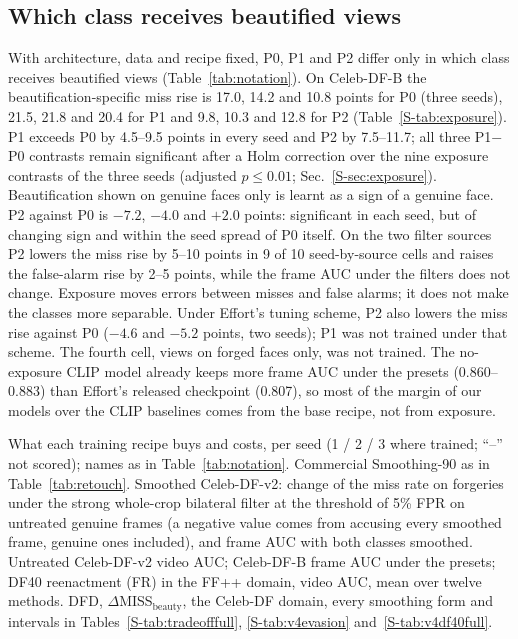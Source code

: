 \documentclass[conference]{IEEEtran}
\begin{document}
\subsection{Which class receives beautified views}
\label{sec:exposure}
With architecture, data and recipe fixed, P0, P1 and P2 differ only in which class receives beautified views
(Table~\ref{tab:notation}). On Celeb-DF-B the beautification-specific miss rise is 17.0, 14.2 and 10.8 points for P0 (three
seeds), 21.5, 21.8 and 20.4 for P1 and 9.8, 10.3 and 12.8 for P2 (Table~\ref{S-tab:exposure}). P1 exceeds P0 by 4.5--9.5 points
in every seed and P2 by 7.5--11.7; all three P1$-$P0 contrasts remain significant after a Holm correction over the nine exposure contrasts of the three seeds (adjusted $p\le0.01$; Sec.~\ref{S-sec:exposure}). Beautification shown on genuine faces only is learnt as a sign of a genuine face. P2
against P0 is $-7.2$, $-4.0$ and $+2.0$ points: significant in each seed, but of changing sign and within the seed spread of P0
itself. On the two filter sources P2 lowers the miss
rise by 5--10 points in 9 of 10 seed-by-source cells and raises the false-alarm rise by 2--5 points, while the frame AUC under
the filters does not change. Exposure moves errors between misses and false alarms; it does not make the classes more
separable. Under Effort's tuning scheme, P2 also lowers the miss rise against P0 ($-4.6$ and $-5.2$ points, two seeds); P1 was
not trained under that scheme. The fourth cell, views on forged faces only, was not trained. The no-exposure CLIP model already
keeps more frame AUC under the presets (0.860--0.883) than Effort's released checkpoint (0.807), so most of the margin of our
models over the CLIP baselines comes from the base recipe, not from exposure.

\begin{table}[t]
\centering
\caption{What each training recipe buys and costs, per seed (1 / 2 / 3 where trained; ``--'' not scored); names as in
Table~\ref{tab:notation}. Commercial Smoothing-90 as in Table~\ref{tab:retouch}. Smoothed Celeb-DF-v2: change of the miss rate on
forgeries under the strong whole-crop bilateral filter at the threshold of 5\% FPR on untreated genuine frames (a negative value
comes from accusing every smoothed frame, genuine ones included), and frame AUC with both classes smoothed. Untreated Celeb-DF-v2
video AUC; Celeb-DF-B frame AUC under the presets; DF40 reenactment (FR) in the FF++ domain, video AUC, mean over twelve methods.
DFD, $\Delta$MISS$_\text{beauty}$, the Celeb-DF domain, every smoothing form and intervals in
Tables~\ref{S-tab:tradeofffull}, \ref{S-tab:v4evasion} and~\ref{S-tab:v4df40full}.}
\label{tab:tradeoff}
\scriptsize
\setlength{\tabcolsep}{2.5pt}
\begin{adjustbox}{max width=\textwidth}\end{adjustbox}
\end{table}
\end{document}
